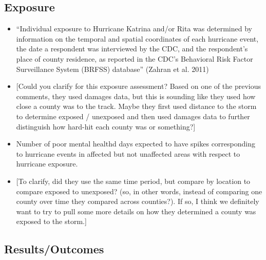 \documentclass[
]{article}
\providecommand{\tightlist}{%
  \setlength{\itemsep}{0pt}\setlength{\parskip}{0pt}}
\begin{document}
\hypertarget{exposure-16}{%
\subsection{Exposure}\label{exposure-16}}

\begin{itemize}
\tightlist
\item
  ``Individual exposure to Hurricane Katrina and/or Rita was determined
  by information on the temporal and spatial coordinates of each
  hurricane event, the date a respondent was interviewed by the CDC, and
  the respondent's place of county residence, as reported in the CDC's
  Behavioral Risk Factor Surveillance System (BRFSS) database'' (Zahran
  et al. 2011)
\item
  {[}Could you clarify for this exposure assessment? Based on one of the
  previous comments, they used damages data, but this is sounding like
  they used how close a county was to the track. Maybe they first used
  distance to the storm to determine exposed / unexposed and then used
  damages data to further distinguish how hard-hit each county was or
  something?{]}
\item
  Number of poor mental healthd days expected to have spikes
  corresponding to hurricane events in affected but not unaffected areas
  with respect to hurricane exposure.
\item
  {[}To clarify, did they use the same time period, but compare by
  location to compare exposed to unexposed? (so, in other words, instead
  of comparing one county over time they compared across counties?). If
  so, I think we definitely want to try to pull some more details on how
  they determined a county was exposed to the storm.{]}
\end{itemize}

\hypertarget{resultsoutcomes-12}{%
\subsection{Results/Outcomes}\label{resultsoutcomes-12}}
\end{document}
